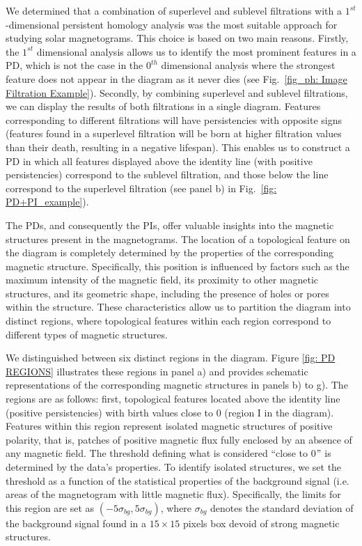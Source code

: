 We determined that a combination of superlevel and sublevel filtrations with a $1^{st}$-dimensional persistent homology analysis was the most suitable approach for studying solar magnetograms. This choice is based on two main reasons. Firstly, the $1^{st}$ dimensional analysis allows us to identify the most prominent features in a PD, which is not the case in the $0^{th}$ dimensional analysis where the strongest feature does not appear in the diagram as it never dies (see Fig.~\ref{fig_ph: Image Filtration Example}). Secondly, by combining superlevel and sublevel filtrations, we can display the results of both filtrations in a single diagram. Features corresponding to different filtrations will have persistencies with opposite signs (features found in a superlevel filtration will be born at higher filtration values than their death, resulting in a negative lifespan). This enables us to construct a PD in which all features displayed above the identity line (with positive persistencies) correspond to the sublevel filtration, and those below the line correspond to the superlevel filtration (see panel b) in Fig.~\ref{fig: PD+PI_example}).

The PDs, and consequently the PIs, offer valuable insights into the magnetic structures present in the magnetograms. The location of a topological feature on the diagram is completely determined by the properties of the corresponding magnetic structure. Specifically, this position is influenced by factors such as the maximum intensity of the magnetic field, its proximity to other magnetic structures, and its geometric shape, including the presence of holes or pores within the structure. These characteristics allow us to partition the diagram into distinct regions, where topological features within each region correspond to different types of magnetic structures.


We distinguished between six distinct regions in the diagram. Figure \ref{fig: PD REGIONS} illustrates these regions in panel a) and provides schematic representations of the corresponding magnetic structures in panels b) to g). The regions are as follows: first, topological features located above the identity line (positive persistencies) with birth values close to 0 (region I in the diagram). Features within this region represent isolated magnetic structures of positive polarity, that is, patches of positive magnetic flux fully enclosed by an absence of any magnetic field. The threshold defining what is considered ``close to 0$"$ is determined by the data's properties. To identify isolated structures, we set the threshold as a function of the statistical properties of the background signal (i.e. areas of the magnetogram with little magnetic flux). Specifically, the limits for this region are set as $(-5 \sigma _ {bg}, 5 \sigma _ {bg})$, where $\sigma _ {bg}$ denotes the standard deviation of the background signal found in a $15\times 15$ pixels box devoid of strong magnetic structures.

